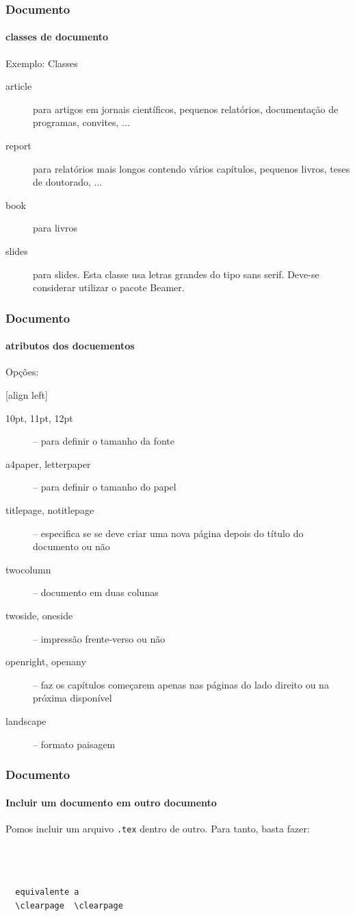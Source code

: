 \begin{frame}[fragile]
\frametitle{Documento}
\framesubtitle{classes de documento}
  Exemplo:
  Classes
  \begin{description}
  \item[article] para artigos em jornais científicos, pequenos relatórios, documentação de programas, convites, ...
  \item[report] para relatórios mais longos contendo vários capítulos, pequenos livros, teses de doutorado, ...  
  \item[book] para livros
  \item[slides] para slides. Esta classe usa letras grandes do tipo sans serif. Deve-se
       considerar utilizar o pacote Beamer.
  \end{description}

\end{frame}

\begin{frame}
\frametitle{Documento}
\framesubtitle{atributos dos docuementos}
  Opções:

  [align left]
  \begin{description}%
  \item[10pt, 11pt, 12pt] -- para definir o tamanho da fonte
  \item[a4paper, letterpaper] -- para definir o tamanho do papel
  \item[titlepage, notitlepage] -- especifica se se deve criar uma nova página depois do título do documento ou não
  \item[twocolumn] -- documento em duas colunas
  \item[twoside, oneside] -- impressão frente-verso ou não  
  \item[openright, openany] -- faz os capítulos começarem apenas nas páginas do lado direito ou na próxima disponível
  \item[landscape] -- formato paisagem
  \end{description}

\end{frame}

\begin{frame}[fragile]
\frametitle{Documento}
\framesubtitle{Incluir um documento em outro documento}
  Pomos incluir um arquivo \texttt{.tex} dentro de outro. Para tanto, basta fazer:
  
  \begin{verbatim}
  
  
   
  equivalente a 
  \clearpage  \clearpage
  \end{verbatim}
\end{frame}



